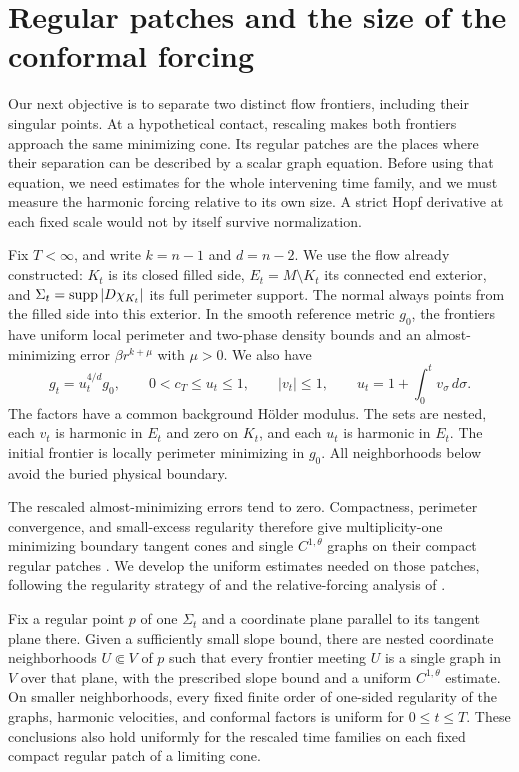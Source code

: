 \section{Regular patches and the size of the conformal forcing}
\label{sec:rpi:regular-patches}

Our next objective is to separate two distinct flow frontiers, including
their singular points. At a hypothetical contact, rescaling makes both
frontiers approach the same minimizing cone. Its regular patches are
the places where their separation can be described by a scalar graph
equation. Before using that equation, we need estimates for the whole
intervening time family, and we must measure the harmonic forcing
relative to its own size. A strict Hopf derivative at each fixed scale
would not by itself survive normalization.

Fix $T<\infty$, and write $k=n-1$ and $d=n-2$. We use the flow
already constructed: $K_t$ is its closed filled side,
$E_t=M\setminus K_t$ its connected end exterior, and
$\Sigma_t=\operatorname{supp}|D\chi_{K_t}|$ its full perimeter support. The
normal always points from the filled side into this exterior. In the
smooth reference metric $g_0$, the frontiers have uniform local
perimeter and two-phase density bounds and an almost-minimizing error
$\beta r^{k+\mu}$ with $\mu>0$. We also have
\[
 g_t=u_t^{4/d}g_0,\qquad
 0<c_T\le u_t\le1,\qquad |v_t|\le1,\qquad
 u_t=1+\int_0^t v_\sigma\,d\sigma.
\]
The factors have a common background H\"older modulus. The sets are
nested, each $v_t$ is harmonic in $E_t$ and zero on $K_t$, and each
$u_t$ is harmonic in $E_t$. The initial frontier is locally perimeter
minimizing in $g_0$. All neighborhoods below avoid the buried physical
boundary.

The rescaled almost-minimizing errors tend to zero. Compactness,
perimeter convergence, and small-excess regularity therefore give
multiplicity-one minimizing boundary tangent cones and single
$C^{1,\theta}$ graphs on their compact regular patches
\cite[Chapter~7]{SimonGMT}. We develop the uniform estimates needed
on those patches, following the regularity strategy of
\cite[Section~2.3]{BiZhu2026} and the relative-forcing analysis of
\cite[Proposition~2.34 and Lemma~2.35]{BiZhu2026v2}.

\begin{lemma}
\label{lem:rpi:simultaneous-regularity}
Fix a regular point $p$ of one $\Sigma_t$ and a coordinate plane
parallel to its tangent plane there. Given a sufficiently small slope
bound, there are nested coordinate neighborhoods $U\Subset V$ of $p$
such that every frontier meeting $U$ is a single graph in $V$ over
that plane, with the prescribed slope bound and a uniform
$C^{1,\theta}$ estimate. On smaller neighborhoods, every fixed
finite order of one-sided regularity of the graphs, harmonic velocities,
and conformal factors is uniform for $0\le t\le T$.
These conclusions also hold uniformly for the rescaled time families
on each fixed compact regular patch of a limiting cone.
\end{lemma}

